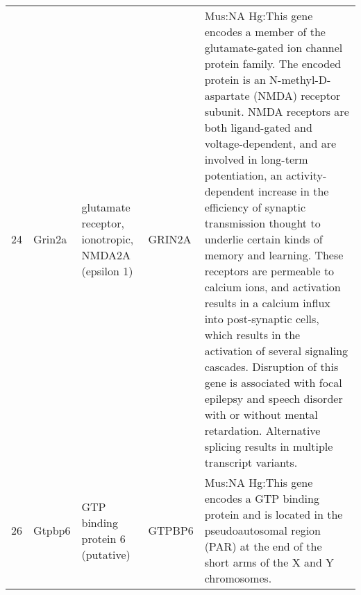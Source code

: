 \documentclass[11pt, landscape]{article}   	%
\begin{document}
\begin{table}[ht]
\begin{tabular}{rlp{3cm}lp{12cm}}
  24 & Grin2a & glutamate receptor, ionotropic, NMDA2A (epsilon 1) & GRIN2A & Mus:NA Hg:This gene encodes a member of the glutamate-gated ion channel protein family. The encoded protein is an N-methyl-D-aspartate (NMDA) receptor subunit. NMDA receptors are both ligand-gated and voltage-dependent, and are involved in long-term potentiation, an activity-dependent increase in the efficiency of synaptic transmission thought to underlie certain kinds of memory and learning. These receptors are permeable to calcium ions, and activation results in a calcium influx into post-synaptic cells, which results in the activation of several signaling cascades. Disruption of this gene is associated with focal epilepsy and speech disorder with or without mental retardation. Alternative splicing results in multiple transcript variants. \\ 
  26 & Gtpbp6 & GTP binding protein 6 (putative) & GTPBP6 & Mus:NA Hg:This gene encodes a GTP binding protein and is located in the pseudoautosomal region (PAR) at the end of the short arms of the X and Y chromosomes. \\ 

   \hline
\end{tabular}
\end{table}
\end{document}
